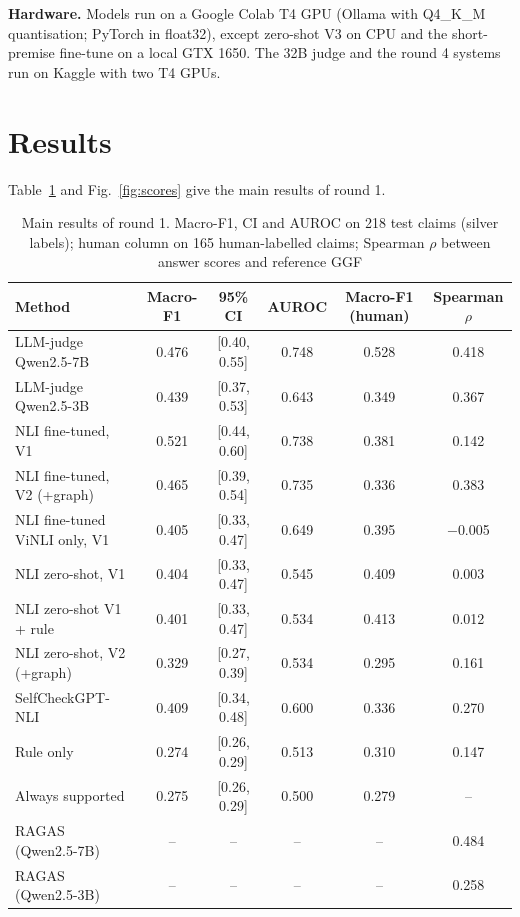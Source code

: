 \documentclass[conference]{IEEEtran}
\begin{document}
\textbf{Hardware.} Models run on a Google Colab T4 GPU (Ollama with Q4\_K\_M quantisation; PyTorch in float32), except zero-shot V3 on CPU and the short-premise fine-tune on a local GTX 1650. The 32B judge and the round 4 systems run on Kaggle with two T4 GPUs.

\section{Results}
Table~\ref{tab:main} and Fig.~\ref{fig:scores} give the main results of round 1.

\begin{table}[t]
\caption{Main results of round 1. Macro-F1, CI and AUROC on 218 test claims (silver labels); human column on 165 human-labelled claims; Spearman $\rho$ between answer scores and reference GGF}
\label{tab:main}
\centering
\footnotesize
\begin{tabular}{lccccc}
\toprule
Method & Macro-F1 & 95\% CI & AUROC & Macro-F1 (human) & Spearman $\rho$ \\
\midrule
LLM-judge Qwen2.5-7B & 0.476 & [0.40, 0.55] & 0.748 & 0.528 & 0.418 \\
LLM-judge Qwen2.5-3B & 0.439 & [0.37, 0.53] & 0.643 & 0.349 & 0.367 \\
NLI fine-tuned, V1 & 0.521 & [0.44, 0.60] & 0.738 & 0.381 & 0.142 \\
NLI fine-tuned, V2 (+graph) & 0.465 & [0.39, 0.54] & 0.735 & 0.336 & 0.383 \\
NLI fine-tuned ViNLI only, V1 & 0.405 & [0.33, 0.47] & 0.649 & 0.395 & $-$0.005 \\
NLI zero-shot, V1 & 0.404 & [0.33, 0.47] & 0.545 & 0.409 & 0.003 \\
NLI zero-shot V1 + rule & 0.401 & [0.33, 0.47] & 0.534 & 0.413 & 0.012 \\
NLI zero-shot, V2 (+graph) & 0.329 & [0.27, 0.39] & 0.534 & 0.295 & 0.161 \\
SelfCheckGPT-NLI & 0.409 & [0.34, 0.48] & 0.600 & 0.336 & 0.270 \\
Rule only & 0.274 & [0.26, 0.29] & 0.513 & 0.310 & 0.147 \\
Always supported & 0.275 & [0.26, 0.29] & 0.500 & 0.279 & -- \\
RAGAS (Qwen2.5-7B) & -- & -- & -- & -- & 0.484 \\
RAGAS (Qwen2.5-3B) & -- & -- & -- & -- & 0.258 \\
\bottomrule
\end{tabular}
\end{table}
\end{document}
